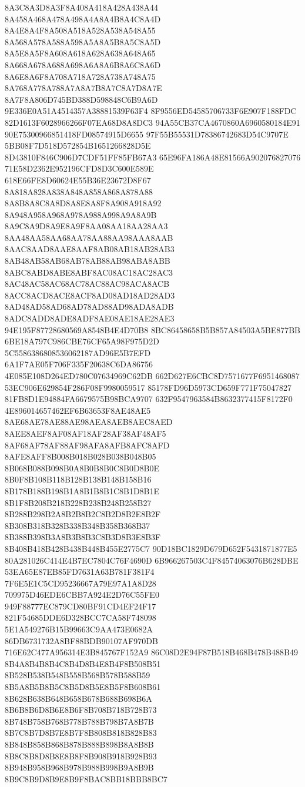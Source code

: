 8A3C8A3D8A3F8A408A418A428A438A44
8A458A468A478A498A4A8A4B8A4C8A4D
8A4E8A4F8A508A518A528A538A548A55
8A568A578A588A598A5A8A5B8A5C8A5D
8A5E8A5F8A608A618A628A638A648A65
8A668A678A688A698A6A8A6B8A6C8A6D
8A6E8A6F8A708A718A728A738A748A75
8A768A778A788A7A8A7B8A7C8A7D8A7E
8A7F8A806D745BD388D598848C6B9A6D
9E336E0A51A4514357A38881539F63F4
8F9556ED54585706733F6E907F188FDC
82D1613F6028966266F07EA68D8A8DC3
94A55CB37CA4670860A6960580184E91
90E75300966851418FD08574915D6655
97F55B55531D78386742683D54C9707E
5BB08F7D518D572854B1651266828D5E
8D43810F846C906D7CDF51FF85FB67A3
65E96FA186A48E81566A902076827076
71E58D2362E952196CFD8D3C600E589E
618E66FE8D60624E55B36E23672D8F67
8A818A828A838A848A858A868A878A88
8A8B8A8C8A8D8A8E8A8F8A908A918A92
8A948A958A968A978A988A998A9A8A9B
8A9C8A9D8A9E8A9F8AA08AA18AA28AA3
8AA48AA58AA68AA78AA88AA98AAA8AAB
8AAC8AAD8AAE8AAF8AB08AB18AB28AB3
8AB48AB58AB68AB78AB88AB98ABA8ABB
8ABC8ABD8ABE8ABF8AC08AC18AC28AC3
8AC48AC58AC68AC78AC88AC98ACA8ACB
8ACC8ACD8ACE8ACF8AD08AD18AD28AD3
8AD48AD58AD68AD78AD88AD98ADA8ADB
8ADC8ADD8ADE8ADF8AE08AE18AE28AE3
94E195F87728680569A8548B4E4D70B8
8BC86458658B5B857A84503A5BE877BB
6BE18A797C986CBE76CF65A98F975D2D
5C5586386808536062187AD96E5B7EFD
6A1F7AE05F706F335F20638C6DA86756
4E085E108D264ED780C07634969C62DB
662D627E6CBC8D7571677F6951468087
53EC906E629854F286F08F9980059517
85178FD96D5973CD659F771F75047827
81FB8D1E94884FA6679575B98BCA9707
632F9547963584B8632377415F8172F0
4E896014657462EF6B63653F8AE48AE5
8AE68AE78AE88AE98AEA8AEB8AEC8AED
8AEE8AEF8AF08AF18AF28AF38AF48AF5
8AF68AF78AF88AF98AFA8AFB8AFC8AFD
8AFE8AFF8B008B018B028B038B048B05
8B068B088B098B0A8B0B8B0C8B0D8B0E
8B0F8B108B118B128B138B148B158B16
8B178B188B198B1A8B1B8B1C8B1D8B1E
8B1F8B208B218B228B238B248B258B27
8B288B298B2A8B2B8B2C8B2D8B2E8B2F
8B308B318B328B338B348B358B368B37
8B388B398B3A8B3B8B3C8B3D8B3E8B3F
8B408B418B428B438B448B455E2775C7
90D18BC1829D679D652F5431871877E5
80A281026C414E4B7EC7804C76F4690D
6B966267503C4F84574063076B628DBE
53EA65E87EB85FD7631A63B781F381F4
7F6E5E1C5CD95236667A79E97A1A8D28
709975D46EDE6CBB7A924E2D76C55FE0
949F88777EC879CD80BF91CD4EF24F17
821F54685DDE6D328BCC7CA58F748098
5E1A549276B15B99663C9AA473E0682A
86DB6731732A8BF88BDB90107AF970DB
716E62C477A956314E3B845767F152A9
86C08D2E94F87B518B468B478B488B49
8B4A8B4B8B4C8B4D8B4E8B4F8B508B51
8B528B538B548B558B568B578B588B59
8B5A8B5B8B5C8B5D8B5E8B5F8B608B61
8B628B638B648B658B678B688B698B6A
8B6B8B6D8B6E8B6F8B708B718B728B73
8B748B758B768B778B788B798B7A8B7B
8B7C8B7D8B7E8B7F8B808B818B828B83
8B848B858B868B878B888B898B8A8B8B
8B8C8B8D8B8E8B8F8B908B918B928B93
8B948B958B968B978B988B998B9A8B9B
8B9C8B9D8B9E8B9F8BAC8BB18BBB8BC7
